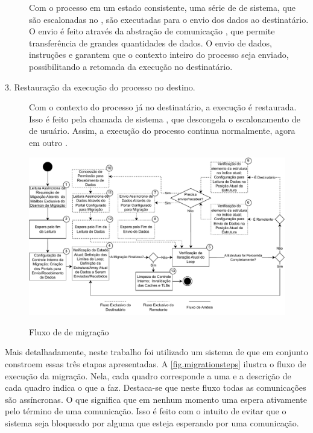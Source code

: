 \begin{description}
    Com o processo em um estado consistente, uma série de \tasks de sistema, que são escalonadas no \mcore, são executadas para o envio dos dados ao \cluster destinatário. O envio é feito através da abstração de comunicação \portal, que permite transferência de grandes quantidades de dados. O envio de dados, instruções e \uarea garantem que o contexto inteiro do processo seja enviado, possibilitando a retomada da execução no \cluster destinatário.
    
    \item[3. Restauração da execução do processo no \cluster destino.] \hfill
	
    Com o contexto do processo já no \cluster destinatário, a execução é restaurada. Isso é feito pela chamada de sistema \unfreeze, que descongela o escalonamento de \threads de usuário. Assim, a execução do processo continua normalmente, agora em outro \cluster.
\end{description}

\begin{figure}[b]
    \centering
    \caption{Fluxo de \tasks de migração}
    \includegraphics[width=\linewidth]{content/images/migration-steps-tasks.pdf}
    \label{fig.migrationsteps}
\end{figure}

Mais detalhadamente, neste trabalho foi utilizado um sistema de \tasks que em conjunto constroem essas três etapas apresentadas. A \autoref{fig.migrationsteps} ilustra o fluxo de execução da migração. Nela, cada quadro corresponde a uma \task e a descrição de cada quadro indica o que a \task faz. Destaca-se que neste fluxo todas as comunicações são assíncronas. O que significa que em nenhum momento uma \task espera ativamente pelo término de uma comunicação. Isso é feito com o intuito de evitar que o sistema seja bloqueado por alguma \task que esteja esperando por uma comunicação. 

